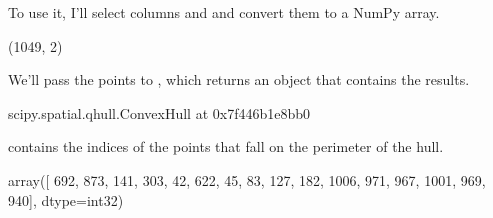 \documentclass[letterpaper,10pt,english]{sphinxmanual}
\begin{document}
To use it, I’ll select columns  and  and convert them to a NumPy array.

\begin{sphinxVerbatim}[commandchars=\\\{\}]
   

  \PYG{p}{[}\PYG{p}{[}\PYG{p}{]}\PYG{p}{]}
\end{sphinxVerbatim}

\begin{sphinxVerbatim}[commandchars=\\\{\}]
(1049, 2)
\end{sphinxVerbatim}

We’ll pass the points to , which returns an object that contains the results.

\begin{sphinxVerbatim}[commandchars=\\\{\}]
   

  
\end{sphinxVerbatim}

\begin{sphinxVerbatim}[commandchars=\\\{\}]
\PYGZlt{}scipy.spatial.qhull.ConvexHull at 0x7f446b1e8bb0\PYGZgt{}
\end{sphinxVerbatim}

 contains the indices of the points that fall on the perimeter of the hull.

\begin{sphinxVerbatim}[commandchars=\\\{\}]
\end{sphinxVerbatim}

\begin{sphinxVerbatim}[commandchars=\\\{\}]
array([ 692,  873,  141,  303,   42,  622,   45,   83,  127,  182, 1006,
        971,  967, 1001,  969,  940], dtype=int32)
\end{sphinxVerbatim}
\end{document}

